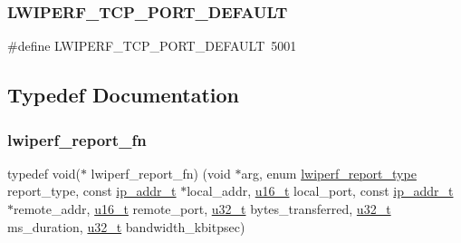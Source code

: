 \subsubsection{\texorpdfstring{L\+W\+I\+P\+E\+R\+F\+\_\+\+T\+C\+P\+\_\+\+P\+O\+R\+T\+\_\+\+D\+E\+F\+A\+U\+LT}{LWIPERF\_TCP\_PORT\_DEFAULT}}
{\footnotesize\ttfamily \#define L\+W\+I\+P\+E\+R\+F\+\_\+\+T\+C\+P\+\_\+\+P\+O\+R\+T\+\_\+\+D\+E\+F\+A\+U\+LT~5001}



\subsection{Typedef Documentation}
\mbox{\label{openmote-cc2538_2lwip_2src_2include_2lwip_2apps_2lwiperf_8h_a248ea47a58a14c6aecf6525217a812fd}} 
\subsubsection{\texorpdfstring{lwiperf\+\_\+report\+\_\+fn}{lwiperf\_report\_fn}}
{\footnotesize\ttfamily typedef void($\ast$ lwiperf\+\_\+report\+\_\+fn) (void $\ast$arg, enum \hyperlink{native_2lwip_2src_2include_2lwip_2apps_2lwiperf_8h_ab72a2d205e43d5243a291f937bbc24d6}{lwiperf\+\_\+report\+\_\+type} report\+\_\+type, const \hyperlink{native_2lwip_2src_2include_2lwip_2ip__addr_8h_a88b43639738c4de2d3cd22e3a1fd7696}{ip\+\_\+addr\+\_\+t} $\ast$local\+\_\+addr, \hyperlink{group__compiler__abstraction_ga77570ac4fcab86864fa1916e55676da2}{u16\+\_\+t} local\+\_\+port, const \hyperlink{native_2lwip_2src_2include_2lwip_2ip__addr_8h_a88b43639738c4de2d3cd22e3a1fd7696}{ip\+\_\+addr\+\_\+t} $\ast$remote\+\_\+addr, \hyperlink{group__compiler__abstraction_ga77570ac4fcab86864fa1916e55676da2}{u16\+\_\+t} remote\+\_\+port, \hyperlink{group__compiler__abstraction_ga4c14294869aceba3ef9d4c0c302d0f33}{u32\+\_\+t} bytes\+\_\+transferred, \hyperlink{group__compiler__abstraction_ga4c14294869aceba3ef9d4c0c302d0f33}{u32\+\_\+t} ms\+\_\+duration, \hyperlink{group__compiler__abstraction_ga4c14294869aceba3ef9d4c0c302d0f33}{u32\+\_\+t} bandwidth\+\_\+kbitpsec)}


